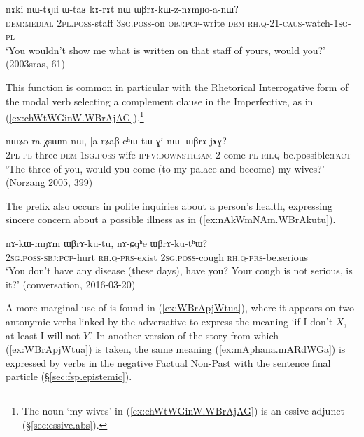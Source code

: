 \begin{exe}
\ex \label{ex:WBrAkWznAmYoanW}
 \gll nɤki nɯ-tɤɲi ɯ-taʁ kɤ-rɤt nɯ ɯβrɤ-kɯ-z-nɤmɲo-a-nɯ? \\
 \textsc{dem}:\textsc{medial} \textsc{2pl}.\textsc{poss}-staff \textsc{3sg}.\textsc{poss}-on \textsc{obj}:\textsc{pcp}-write \textsc{dem} \textsc{rh}.\textsc{q}-2\fl{}1-\textsc{caus}-watch-\textsc{1sg}-\textsc{pl} \\
 \glt `You wouldn't show me what is written on that staff of yours, would you?' (2003sras, 61)
\end{exe}

 This function is common in particular with the Rhetorical Interrogative form  of the modal verb  selecting a complement clause in the Imperfective, as in (\ref{ex:chWtWGinW.WBrAjAG}).\footnote{The noun  `my wives' in (\ref{ex:chWtWGinW.WBrAjAG}) is an essive adjunct (§\ref{sec:essive.abs}).  }
 

\begin{exe}
\ex \label{ex:chWtWGinW.WBrAjAG}
 \gll nɯʑo ra χsɯm nɯ, [a-rʑaβ cʰɯ-tɯ-ɣi-nɯ] ɯβrɤ-jɤɣ? \\
 \textsc{2pl} \textsc{pl} three \textsc{dem} \textsc{1sg}.\textsc{poss}-wife \textsc{ipfv}:\textsc{downstream}-2-come-\textsc{pl} \textsc{rh}.\textsc{q}-be.possible:\textsc{fact} \\
 \glt `The three of you, would you come (to my palace and become) my wives?' (Norzang 2005, 399)
\end{exe}

The prefix  also occurs in polite inquiries about a person's health, expressing sincere concern about a possible illness as in (\ref{ex:nAkWmNAm.WBrAkutu}).

\begin{exe}
\ex \label{ex:nAkWmNAm.WBrAkutu}
 \gll  nɤ-kɯ-mŋɤm ɯβrɤ-ku-tu, nɤ-ɕqʰe ɯβrɤ-ku-tʰɯ? \\
\textsc{2sg}.\textsc{poss}-\textsc{sbj}:\textsc{pcp}-hurt  \textsc{rh}.\textsc{q}-\textsc{prs}-exist 
\textsc{2sg}.\textsc{poss}-cough  \textsc{rh}.\textsc{q}-\textsc{prs}-be.serious \\
\glt `You don't have any disease (these days), have you? Your cough is not serious, is it?' (conversation, 2016-03-20)
\end{exe}

A more marginal use of  is found in (\ref{ex:WBrApjWtua}), where it appears  on two antonymic verbs linked by the adversative  to express the meaning `if I don't $X$, at least I will not $Y$.' In another version of the story from which (\ref{ex:WBrApjWtua}) is taken, the same meaning (\ref{ex:mAphana.mARdWGa}) is expressed by verbs in the negative Factual Non-Past with the sentence final particle  (§\ref{sec:fsp.epistemic}).

